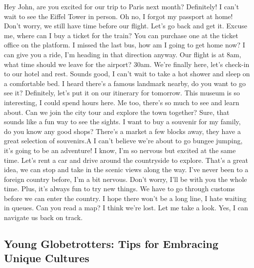 \documentclass[]{article} %
\begin{document}
\begin{minipage}[h]{0.99\textwidth}
	
	\begin{dialogue}
		 Hey John, are you excited for our trip to Paris next month?
		 Definitely! I can't wait to see the Eiffel Tower in person.
		 Oh no, I forgot my passport at home!
		 Don't worry, we still have time before our flight. Let's go back and get it.
		 Excuse me, where can I buy a ticket for the train?
		 You can purchase one at the ticket office on the platform.
		 I missed the last bus, how am I going to get home now?
		 I can give you a ride, I'm heading in that direction anyway.
		 Our flight is at 8am, what time should we leave for the airport?
		 30am.
		 We're finally here, let's check-in to our hotel and rest.
		 Sounds good, I can't wait to take a hot shower and sleep on a comfortable bed.
		 I heard there's a famous landmark nearby, do you want to go see it?
		 Definitely, let's put it on our itinerary for tomorrow.
		 This museum is so interesting, I could spend hours here.
		 Me too, there's so much to see and learn about.
		 Can we join the city tour and explore the town together?
		 Sure, that sounds like a fun way to see the sights.
		 I want to buy a souvenir for my family, do you know any good shops?
		 There's a market a few blocks away, they have a great selection of souvenirs.A I can't believe we're about to go bungee jumping, it's going to be an adventure!
		 I know, I'm so nervous but excited at the same time.
		 Let's rent a car and drive around the countryside to explore.
		 That's a great idea, we can stop and take in the scenic views along the way.
		 I've never been to a foreign country before, I'm a bit nervous.
		 Don't worry, I'll be with you the whole time. Plus, it's always fun to try new things.
		 We have to go through customs before we can enter the country.
		 I hope there won't be a long line, I hate waiting in queues.
		 Can you read a map? I think we're lost.
		 Let me take a look. Yes, I can navigate us back on track.
		
		
		
	\end{dialogue}
	
\end{minipage}


\iffalse
\subsection*{Young Globetrotters: Tips for Embracing Unique Cultures}
\end{document}
